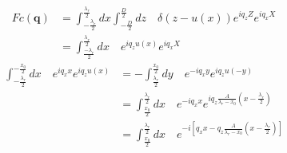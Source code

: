 \documentclass[letterpage]{article}
\begin{document}
\begin{align}
  Fc(\textbf{q}) &= \int_{-\frac{\lambda_r}{2}}^{\frac{\lambda_r}{2}}dx
  \int_{-\frac{D}{2}}^\frac{D}{2} dz \quad \delta\left(z-u(x)\right)
  e^{iq_zZ} e^{iq_xX} \\
  &= \int_{\frac{-\lambda_r}{2}}^{\frac{\lambda_r}{2}} dx \quad e^{iq_zu(x)}
  e^{iq_xX}
\end{align}
\begin{align}
  \int_{-\frac{\lambda_r}{2}}^{-\frac{x_0}{2}} dx \quad e^{iq_xx} e^{iq_zu(x)}
  &= -\int_{\frac{\lambda_r}{2}}^{\frac{x_0}{2}} 
  dy \quad e^{-iq_xy}e^{iq_zu(-y)}\\
  &= \int_{\frac{x_0}{2}}^{\frac{\lambda_r}{2}} dx \quad e^{-iq_xx} 
  e^{iq_z\frac{A}{\lambda_r-x_0}\left(x-\frac{\lambda_r}{2}\right)}\\
  &= \int_{\frac{x_0}{2}}^{\frac{\lambda_r}{2}}dx \quad 
  e^{-i\left[q_xx - q_z \frac{A}{\lambda_r-x_0}
  \left(x-\frac{\lambda_r}{2}\right)\right]}
\end{align}
\end{document}
